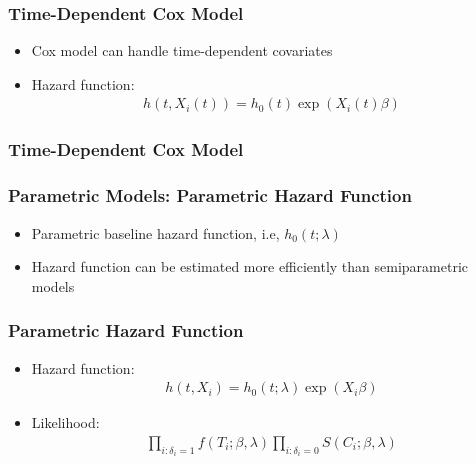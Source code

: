\documentclass[14pt]{beamer}
\begin{document}
	\begin{frame}
	\frametitle{Time-Dependent Cox Model}
	\begin{itemize}
	\item Cox model can handle time-dependent covariates
	\item Hazard function:
	\begin{eqnarray*}
	h(t,X_i(t)) = h_0(t) \exp(X_i(t) \beta)
	\end{eqnarray*}

	\end{itemize}

	\end{frame}

	\begin{frame}
	\frametitle{Time-Dependent Cox Model}
	\end{frame}

	\begin{frame}
	\frametitle{Parametric Models: Parametric Hazard Function}
	\begin{itemize}
	\item Parametric baseline hazard function, i.e, $h_0(t; \lambda)$
	\item Hazard function can be estimated more efficiently than semiparametric models

	\end{itemize}

	\end{frame}

	\begin{frame}
	\frametitle{Parametric Hazard Function}
	\begin{itemize}
	\item Hazard function:
	\begin{eqnarray*}
	h(t,X_i) = h_0(t; \lambda) \exp(X_i \beta)
	\end{eqnarray*}
	\item Likelihood:
	\begin{eqnarray*}
	\prod_{i:\delta_i = 1} f(T_i; \beta, \lambda) \prod_{i:\delta_i = 0} S(C_i; \beta, \lambda)
	\end{eqnarray*}

	\end{itemize}

	\end{frame}
\end{document}
